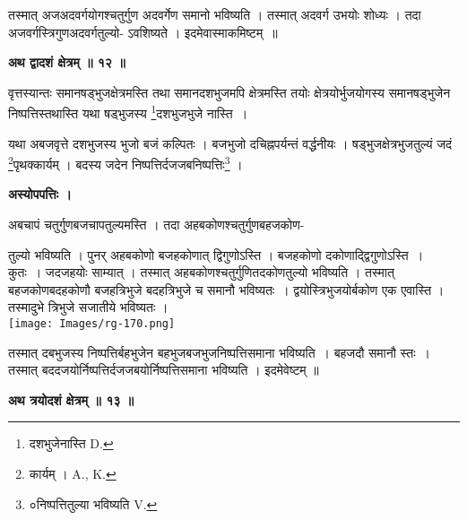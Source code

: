 \documentclass[11pt, openany]{book}
\begin{document}
\newpage

\noindent तस्मात् अजअदवर्गयोगश्चतुर्गुण अदवर्गेण समानो भविष्यति ।
तस्मात् अदवर्ग उभयोः शोध्यः । तदा अजवर्गस्त्रिगुणअदवर्गतुल्यो-
ऽवशिष्यते । इदमेवास्माकमिष्टम्~॥\\
\vspace{2mm}

\begin{center}
\textbf{\large अथ द्वादशं क्षेत्रम् ॥ १२ ॥ }
\end{center}
\vspace{2mm}

{\ab वृत्तस्यान्तः समानषड्भुजक्षेत्रमस्ति तथा समानदशभुजमपि क्षेत्रमस्ति तयोः क्षेत्रयोर्भुजयोगस्य समानषड्भुजेन निष्पत्तिस्तथास्ति यथा षड्भुजस्य \renewcommand{\thefootnote}{१}\footnote{दशभुजेनास्ति {\en D.} }दशभुजभुजे नास्ति~।}\\
\vspace{3mm}

यथा अबजवृत्ते दशभुजस्य भुजो बजं कल्पितः । बजभुजो दचिह्नपर्यन्तं वर्द्धनीयः । षड्भुजक्षेत्रभुजतुल्यं जदं \renewcommand{\thefootnote}{२}\footnote{कार्यम् । {\en A., K.}}पृथक्कार्यम् । बदस्य जदेन निष्पत्तिर्दजजबनिष्पत्तिः\renewcommand{\thefootnote}{३}\footnote{०निष्पत्तितुल्या भविष्यति {\en V.}} ।\\
\begin{center}
\textbf{\large अस्योपपत्तिः । }
\end{center}
\vspace{5mm}

अबचापं चतुर्गुणबजचापतुल्यमस्ति । तदा अहबकोणश्चतुर्गुणबहजकोण-
\begin{vwcol}[widths={0.7,0.3}, sep=.8cm, rule=0pt]
तुल्यो भविष्यति । पुनर् अहबकोणो बजहकोणात् द्विगुणोऽस्ति । बजहकोणो दकोणाद्द्विगुणोऽस्ति~। कुतः~। जदजहयोः साम्यात् । तस्मात् अहबकोणश्चतुर्गुणितदकोणतुल्यो भविष्यति । तस्मात् बहजकोणबदहकोणौ
बजहत्रिभुजे बदहत्रिभुजे च समानौ भविष्यतः~। द्वयोस्त्रिभुजयोर्बकोण एक एवास्ति ।
तस्मादुभे त्रिभुजे सजातीये भविष्यतः ।\\
\noindent \texttt{[image: Images/rg-170.png]}  
\end{vwcol}
\vspace{-3mm}

\noindent तस्मात् दबभुजस्य निष्पत्तिर्बहभुजेन 
बहभुजबजभुजनिष्पत्तिसमाना भविष्यति~। बहजदौ समानौ स्तः~। तस्मात् बददजयोर्निष्पत्तिर्दजजबयोर्निष्पत्तिसमाना भविष्यति । इदमेवेष्टम् ॥


\newpage
\begin{center}
\textbf{\large अथ त्रयोदशं क्षेत्रम् ॥ १३ ॥ }
\end{center}
\vspace{2mm}
\end{document}
